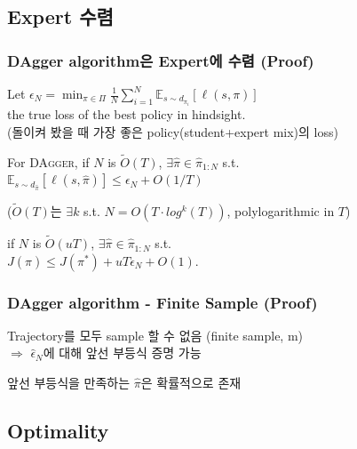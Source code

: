 \documentclass[11pt,xcolor={dvipsnames},hyperref={pdftex,pdfpagemode=UseNone,hidelinks,pdfdisplaydoctitle=true},usepdftitle=false]{beamer}
\begin{document}
\subsection*{Expert 수렴}
\begin{frame}
\frametitle{DAgger algorithm은 Expert에 수렴 (Proof)}
Let $\epsilon_N = \min_{\pi \in \Pi} \frac{1}{N} \sum_{i=1}^N \mathbb{E}_{s \sim d_{\pi_i}}[ \ell(s,\pi) ]$ \\
the true loss of the best policy in hindsight. \\
(돌이켜 봤을 때 가장 좋은 policy(student+expert mix)의 loss)

\begin{theorem}
    For \textsc{DAgger}, if $N$ is $\tilde{O}(T)$, \: $\exists \hat{\pi} \in \hat{\pi}_{1:N}$ s.t. \\
    $\mathbb{E}_{s \sim d_{\hat{\pi}}}[ \ell(s,\hat{\pi}) ] \leq \epsilon_N + O(1/T)$

    {\small ($\tilde{O}(T)$는 \: $\exists k$ s.t. $N = O(T \cdot log^k(T))$, \: polylogarithmic in $T$)}
\end{theorem}

\begin{theorem}
    if $N$ is $\tilde{O}(uT)$, \: $\exists \hat{\pi} \in \hat{\pi}_{1:N}$ s.t. \\
    $J(\hat{\pi}) \leq J(\pi^*) + uT\epsilon_N + O(1)$.
\end{theorem} 
\end{frame}


\begin{frame}
\frametitle{DAgger algorithm - Finite Sample (Proof)}
Trajectory를 모두 sample 할 수 없음 (finite sample, m) \\
$\Rightarrow$ $\hat{\epsilon}_N$에 대해 앞선 부등식 증명 가능

\vspace{10mm}

앞선 부등식을 만족하는 $\hat{\pi}$은 확률적으로 존재

\end{frame}
    
\subsection*{Optimality}
\end{document}
